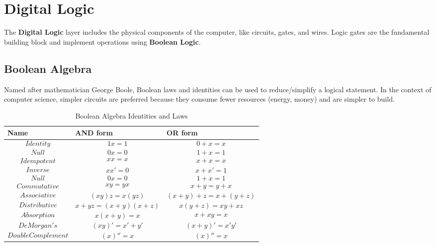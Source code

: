 \documentclass[pdftex,10pt]{article}
\begin{document}
\section{Digital Logic}

The \textbf{Digital Logic} layer includes the physical components of the computer, like circuits, gates, and wires. Logic gates are the fundamental building block and implement operations using \textbf{Boolean Logic}.

\subsection{Boolean Algebra}

Named after mathematician George Boole, Boolean laws and identities can be used to reduce/simplify a logical statement. In the context of computer science, simpler circuits are preferred because they consume fewer resources (energy, money) and are simpler to build.

\begin{table}[htbp]
    \abovedisplayskip=-5pt
    \belowdisplayskip=-5pt
    \centering
    \begin{tabularx}{\textwidth}{| X | X | X |}
        \hline
        Name                 & AND form              & OR form               \\ \hline
        \[Identity\]         & \[1x = 1\]            & \[0+x = x\]           \\ \hline
        \[Null\]             & \[0x = 0\]            & \[1 +x =1\]           \\ \hline
        \[Idempotent\]       & \[xx = x\]            & \[x + x = x\]         \\ \hline
        \[Inverse\]          & \[xx' = 0\]           & \[x + x' = 1\]        \\ \hline
        \[Null\]             & \[0x = 0\]            & \[1 +x =1\]           \\ \hline
        \[Commutative\]      & \[xy = yx\]           & \[x+y = y + x\]       \\ \hline
        \[Associative\]      & \[(xy)z = x(yz)\]     & \[(x+y)+z = x+(y+z)\] \\ \hline
        \[Distributive\]     & \[x+yz = (x+y)(x+z)\] & \[x(y+z) = xy+xz\]    \\ \hline
        \[Absorption\]       & \[x(x+y) = x\]        & \[x + xy = x\]        \\ \hline
        \[DeMorgan's\]       & \[(xy)' = x'+y'\]     & \[(x+y)' = x'y'\]     \\ \hline
        \[DoubleComplement\] & \[(x)'' = x\]         & \[(x)'' = x\]         \\ \hline
    \end{tabularx}
    \caption{Boolean Algebra Identities and Laws}

\end{table}
\end{document}
